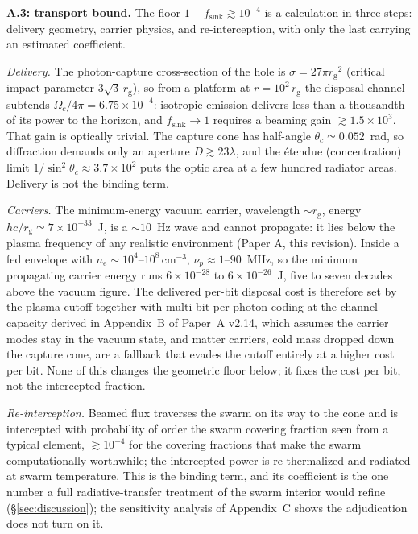 \documentclass[11pt]{article}
\newcommand{\rg}{\ensuremath{r_{\mathrm{g}}}}
\begin{document}
\textbf{A.3: transport bound.} The floor $1 - f_{\mathrm{sink}} \gtrsim 10^{-4}$ is a calculation in three steps: delivery geometry, carrier physics, and re-interception, with only the last carrying an estimated coefficient.

\emph{Delivery.} The photon-capture cross-section of the hole is $\sigma = 27\pi\rg^{2}$ (critical impact parameter $3\sqrt{3}\,\rg$), so from a platform at $r = 10^{2}\,\rg$ the disposal channel subtends $\Omega_{c}/4\pi = 6.75\times10^{-4}$: isotropic emission delivers less than a thousandth of its power to the horizon, and $f_{\mathrm{sink}} \to 1$ requires a beaming gain $\gtrsim 1.5\times10^{3}$. That gain is optically trivial. The capture cone has half-angle $\theta_{c} \simeq 0.052$~rad, so diffraction demands only an aperture $D \gtrsim 23\lambda$, and the \'etendue (concentration) limit $1/\sin^{2}\theta_{c} \approx 3.7\times10^{2}$ puts the optic area at a few hundred radiator areas. Delivery is not the binding term.

\emph{Carriers.} The minimum-energy vacuum carrier, wavelength $\sim \rg$, energy $hc/\rg \simeq 7\times10^{-33}$~J, is a $\sim 10$~Hz wave and cannot propagate: it lies below the plasma frequency of any realistic environment (Paper A, this revision). Inside a fed envelope with $n_{e} \sim 10^{4}$--$10^{8}\,\mathrm{cm^{-3}}$, $\nu_{p} \approx 1$--$90$~MHz, so the minimum propagating carrier energy runs $6\times10^{-28}$ to $6\times10^{-26}$~J, five to seven decades above the vacuum figure. The delivered per-bit disposal cost is therefore set by the plasma cutoff together with multi-bit-per-photon coding at the channel capacity derived in Appendix~B of Paper~A v2.14, which assumes the carrier modes stay in the vacuum state, and matter carriers, cold mass dropped down the capture cone, are a fallback that evades the cutoff entirely at a higher cost per bit. None of this changes the geometric floor below; it fixes the cost per bit, not the intercepted fraction.

\emph{Re-interception.} Beamed flux traverses the swarm on its way to the cone and is intercepted with probability of order the swarm covering fraction seen from a typical element, $\gtrsim 10^{-4}$ for the covering fractions that make the swarm computationally worthwhile; the intercepted power is re-thermalized and radiated at swarm temperature. This is the binding term, and its coefficient is the one number a full radiative-transfer treatment of the swarm interior would refine (\S\ref{sec:discussion}); the sensitivity analysis of Appendix~C shows the adjudication does not turn on it.
\end{document}
